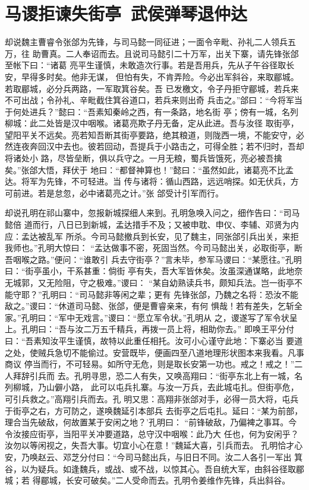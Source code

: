 \chapter{马谡拒谏失街亭~武侯弹琴退仲达}

却说魏主曹睿令张郃为先锋，与司马懿一同征进；一面令辛毗、孙礼二人领兵五万，往
助曹真。二人奉诏而去。且说司马懿引二十万军，出关下寨，请先锋张郃至帐下曰：“诸葛
亮平生谨慎，未敢造次行事。若是吾用兵，先从子午谷径取长安，早得多时矣。他非无谋，
但怕有失，不肯弄险。今必出军斜谷，来取郿城。若取郿城，必分兵两路，一军取箕谷矣。吾
已发檄文，令子丹拒守郿城，若兵来不可出战；令孙礼、辛毗截住箕谷道口，若兵来则出奇
兵击之。”郃曰：“今将军当于何处进兵？”懿曰：“吾素知秦岭之西，有一条路，地名街
亭；傍有一城，名列柳城：此二处皆是汉中咽喉。诸葛亮欺子丹无备，定从此进。吾与汝径
取街亭，望阳平关不远矣。亮若知吾断其街亭要路，绝其粮道，则陇西一境，不能安守，必
然连夜奔回汉中去也。彼若回动，吾提兵于小路击之，可得全胜；若不归时，吾却将诸处小
路，尽皆垒断，俱以兵守之。一月无粮，蜀兵皆饿死，亮必被吾擒矣。”张郃大悟，拜伏于
地曰：“都督神算也！”懿曰：“虽然如此，诸葛亮不比孟达。将军为先锋，不可轻进。当
传与诸将：循山西路，远远哨探。如无伏兵，方可前进。若是怠忽，必中诸葛亮之计。”张
郃受计引军而行。

却说孔明在祁山寨中，忽报新城探细人来到。孔明急唤入问之，细作告曰：“司马懿倍
道而行，八日已到新城，孟达措手不及；又被申耽、申仪、李辅、邓贤为内应：孟达被乱军
所杀。今司马懿撤兵到长安，见了魏主，同张郃引兵出关，来拒我师也。”孔明大惊曰：
“孟达做事不密，死固当然。今司马懿出关，必取街亭，断吾咽喉之路。”便问：“谁敢引
兵去守街亭？”言未毕，参军马谡曰：“某愿往。”孔明曰：“街亭虽小，干系甚重：倘街
亭有失，吾大军皆休矣。汝虽深通谋略，此地奈无城郭，又无险阻，守之极难。”谡曰：
“某自幼熟读兵书，颇知兵法。岂一街亭不能守耶？”孔明曰：“司马懿非等闲之辈；更有
先锋张郃，乃魏之名将：恐汝不能敌之。”谡曰：“休道司马懿、张郃，便是曹睿亲来，有何
惧哉！若有差失，乞斩全家。”孔明曰：“军中无戏言。”谡曰：“愿立军令状。”孔明从
之，谡遂写了军令状呈上。孔明曰：“吾与汝二万五千精兵，再拨一员上将，相助你去。”
即唤王平分付曰：“吾素知汝平生谨慎，故特以此重任相托。汝可小心谨守此地：下寨必当
要道之处，使贼兵急切不能偷过。安营既毕，便画四至八道地理形状图本来我看。凡事商议
停当而行，不可轻易。如所守无危，则是取长安第一功也。戒之！戒之！”二人拜辞引兵而
去。孔明寻思，恐二人有失，又唤高翔曰：“街亭东北上有一城，名列柳城，乃山僻小路，
此可以屯兵扎寨。与汝一万兵，去此城屯扎。但街亭危，可引兵救之。”高翔引兵而去。孔
明又思：高翔非张郃对手，必得一员大将，屯兵于街亭之右，方可防之，遂唤魏延引本部兵
去街亭之后屯扎。延曰：“某为前部，理合当先破敌，何故置某于安闲之地？’孔明曰：
“前锋破敌，乃偏裨之事耳。今令汝接应街亭，当阳平关冲要道路，总守汉中咽喉：此乃大
任也，何为安闲乎？汝勿以等闲视之，失吾大事。切宜小心在意！”魏延大喜，引兵而去。
孔明恰才心安，乃唤赵云、邓芝分付曰：“今司马懿出兵，与旧日不同。汝二人各引一军出
箕谷，以为疑兵。如逢魏兵，或战、或不战，以惊其心。吾自统大军，由斜谷径取郿城；若
得郿城，长安可破矣。”二人受命而去。孔明令姜维作先锋，兵出斜谷。

